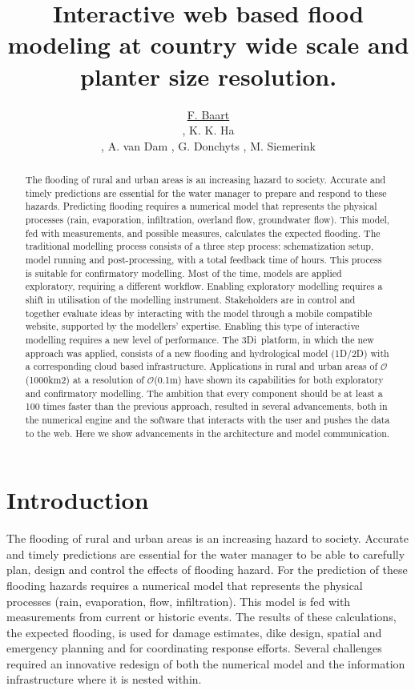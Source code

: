 \documentclass[a4paper]{article}
\title{Interactive web based flood modeling at country wide scale and planter size resolution.}
\author{\underline{F. Baart}
  \address[A1]{\it{Deltares,
      Rotterdamseweg
      Delft, The Netherlands (fedor.baart@deltares.nl, arthur.vandam@deltares.nl, gennadii.donchyts@deltares.nl)}},
  K. K. Ha
  \address[B1]{\it{Nelen \& Schuurmans,
      Zakkendragerssteeg,
      Utrecht, The Netherlands (jack.ha@nelen-schuurmans.nl, martijn.siemerink@nelen-schuurmans.nl)}},
  A. van Dam \addressmark[A1],
  G. Donchyts \addressmark[A1],
  M. Siemerink \addressmark[B1]
}
\DeclareRobustCommand{\orderof}{\ensuremath{\mathcal{O}}}
\DeclareRobustCommand{\threedi}{3Di~}
\begin{document}
\sffamily
\sansmath


\begin{abstract}
  The flooding of rural and urban areas is an increasing hazard to society. Accurate and timely predictions are essential for the water manager to prepare and respond to these hazards.
  Predicting flooding requires a numerical model that represents the physical processes (rain, evaporation, infiltration, overland flow, groundwater flow). This model, fed with measurements, and possible measures, calculates the expected flooding.
  The traditional modelling process consists of a three step process: schematization setup, model running and post-processing, with a total feedback time of hours.  This process is suitable for confirmatory modelling. Most of the time, models are applied exploratory, requiring a different workflow.
  Enabling exploratory modelling requires a shift in utilisation of the modelling instrument. Stakeholders are in control and together evaluate ideas by interacting with the model through a mobile compatible website, supported by the modellers’ expertise. Enabling this type of interactive modelling requires a new level of performance.
  The \threedi platform, in which the new approach was applied, consists of a new flooding and hydrological model (1D/2D) with a corresponding cloud based infrastructure. Applications in rural and urban areas of \orderof(1000km2) at a resolution of \orderof(0.1m) have shown its capabilities for both exploratory and confirmatory modelling.
  The ambition that every component should be at least a 100 times faster than the previous approach, resulted in several advancements, both in the numerical engine and the software that interacts with the user and pushes the data to the web. Here we show advancements in the architecture and model communication.

\end{abstract}
\begin{keyword}
\end{keyword}

\maketitle


\section{Introduction}
The flooding of rural and urban areas is an increasing hazard to society. Accurate and timely predictions are essential for the water manager to be able to carefully plan, design and control the effects of flooding hazard.
For the prediction of these flooding hazards requires a numerical model that represents the physical processes (rain, evaporation, flow, infiltration). This model is fed with measurements from current or historic events. The results of these calculations, the expected flooding, is used for damage estimates, dike design, spatial and emergency planning and for coordinating response efforts. Several challenges required an innovative redesign of both the numerical model and the information infrastructure where it is nested within.
\end{document}
